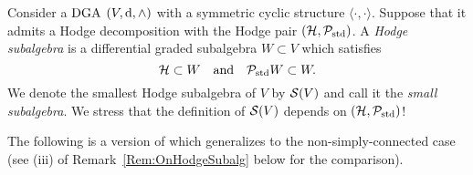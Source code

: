 \documentclass[\MainFolder/Text.tex]{subfiles}
\begin{document}
\begin{Definition}\label{Def:SmallSubalg}
Consider a $\mathrm{DGA}$ $(V,\mathrm{d},\wedge)$ with a symmetric cyclic structure $\langle\cdot,\cdot\rangle$. Suppose that it admits a Hodge decomposition with the Hodge pair $(\mathcal{H},\mathcal{P}_{\mathrm{std}})$. A \emph{Hodge subalgebra} is a differential graded subalgebra $W\subset V$ which satisfies
\[ \mathcal{H}\subset W \quad\text{and}\quad \mathcal{P}_{\mathrm{std}} W \subset W. \]
We denote the smallest Hodge subalgebra of $V$ by $\mathcal{S}(V)$ and call it the \emph{small subalgebra}. We stress that the definition of $\mathcal{S}(V)$ depends on $(\mathcal{H},\mathcal{P}_{\mathrm{std}})$!
\end{Definition}

The following is a version of \cite[Proposition~3.3]{Van2019} which generalizes to the non-simply-connected case (see (iii) of Remark~\ref{Rem:OnHodgeSubalg} below for the comparison).
\end{document}
